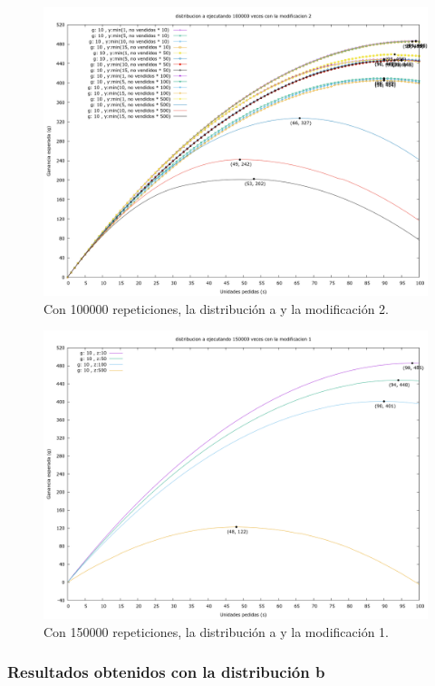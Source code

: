 \documentclass[12pt, spanish]{article}
\begin{document}
\begin{figure}[H]
	\centering
	\includegraphics[scale = 0.2]{prob_a/datos_a_100000_2.png}
	\caption{Con 100000 repeticiones, la distribución a y la modificación 2.}
	\label{fig:ej1_a_100000}

\end{figure}

\begin{figure}[H]
	\centering
	\includegraphics[scale = 0.2]{prob_a/datos_a_150000_1.png}
	\caption{Con 150000 repeticiones, la distribución a y la modificación 1.}
	\label{fig:ej1_a_150000}

\end{figure}


\subsubsection{Resultados obtenidos con la distribución b}
\end{document}
